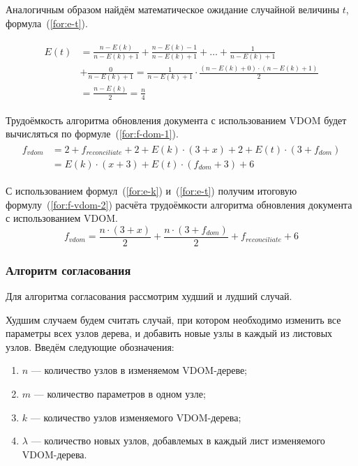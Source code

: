 Аналогичным образом найдём математическое ожидание случайной величины $t$, формула~(\ref{for:e-t}).

\begin{align}
	\begin{split}
		\label{for:e-t}
		E(t) &= \frac{n - E(k)}{n - E(k) + 1} + \frac{n - E(k) - 1}{n - E(k) + 1} + \dotsc +  \frac{1}{n - E(k) + 1} \\
		&+\frac{0}{n - E(k) + 1} = \frac{1}{n - E(k) + 1} \cdot \frac{(n - E(k) + 0)\cdot(n - E(k) + 1)}{2}\\
		&= \frac{n - E(k)}{2} = \frac{n}{4}
	\end{split}
\end{align}

Трудоёмкость алгоритма обновления документа с использованием VDOM будет вычисляться по формуле~(\ref{for:f-dom-1}).
\begin{align}
	\begin{split}
	\label{for:f-vdom-1}
	f_{vdom} &= 2 + f_{reconciliate} + 2 + E(k)\cdot(3 + x) + 2 + E(t)\cdot(3 + f_{dom}) \\
	&= E(k) \cdot (x + 3) + E(t) \cdot (f_{dom} + 3) + 6
	\end{split}
\end{align}

С использованием формул~(\ref{for:e-k}) и~(\ref{for:e-t}) получим итоговую формулу~(\ref{for:f-vdom-2}) расчёта трудоёмкости алгоритма обновления документа с использованием VDOM.
\begin{equation}
	\label{for:f-vdom-2}
	f_{vdom} = \frac{n \cdot (3 + x)}{2} + \frac{n\cdot(3 + f_{dom})}{2} + f_{reconciliate} + 6
\end{equation}


\subsubsection{Алгоритм согласования}

Для алгоритма согласования рассмотрим худший и лудший случай.

Худшим случаем будем считать случай, при котором необходимо изменить все параметры всех узлов дерева, и добавить новые узлы в каждый из листовых узлов.
Введём следующие обозначения:
\begin{enumerate}[label=\arabic*)]
	\item $n$ --- количество узлов в изменяемом VDOM-дереве;
	\item $m$ --- количество параметров в одном узле;
	\item $k$ --- количество узлов изменяемого VDOM-дерева;
	\item $\lambda$ --- количество новых узлов, добавлемых в каждый лист изменяемого VDOM-дерева.
\end{enumerate}

